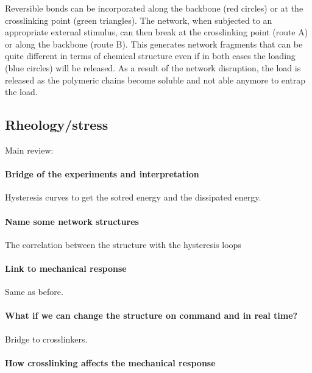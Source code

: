 Reversible bonds can be incorporated along the backbone (red circles) or at the crosslinking point (green triangles). 
The network, when subjected to an appropriate external stimulus, can then break at the crosslinking point (route A) or along the backbone (route B). 
This generates network fragments that can be quite different in terms of chemical structure even if in both cases the loading (blue circles) will be released. 
As a result of the network disruption, the load is released as the polymeric chains become soluble and not able anymore to entrap the load\citep{picchioniHydrogelsBasedDynamic2018}. 

\subsection{Rheology/stress}\label{ch1:NetworkStructure}

Main review:\citep{guPolymerNetworksPlastics2020,sheikoArchitecturalCodeRubber2019}

\paragraph{Bridge of the experiments and interpretation} Hysteresis curves to get the sotred energy and the dissipated energy.

\paragraph{Name some network structures} The correlation between the structure with the hysteresis loops

\paragraph{Link to mechanical response} Same as before.


\paragraph{What if we can change the structure on command and in real time?} Bridge to crosslinkers.

\paragraph{How crosslinking affects the mechanical response}

